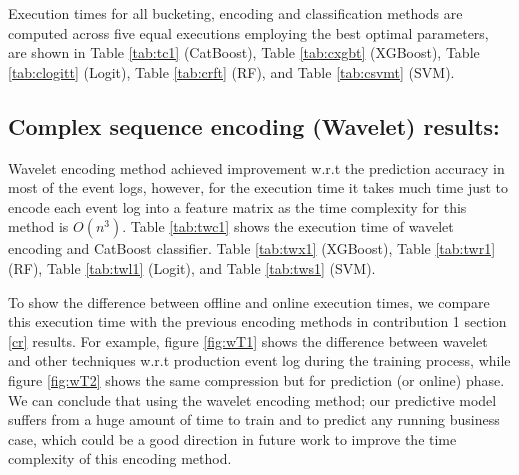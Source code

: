 Execution times for all bucketing, encoding and classification methods are computed across five equal executions employing the best optimal parameters, are shown in Table \ref{tab:tc1} (CatBoost), Table  \ref{tab:cxgbt} (XGBoost), Table \ref{tab:clogitt} (Logit), Table \ref{tab:crft} (RF), and Table  \ref{tab:csvmt} (SVM).









\subsection{Complex sequence encoding (Wavelet) results:}
Wavelet encoding method achieved improvement w.r.t the prediction accuracy in most of the event logs, however, for the execution time it takes much time just to encode each event log into a feature matrix as the time complexity for this method is $O(n^3)$. Table \ref{tab:twc1} shows the execution time of wavelet encoding and CatBoost classifier. Table \ref{tab:twx1} (XGBoost), Table \ref{tab:twr1} (RF), Table \ref{tab:twl1} (Logit), and Table \ref{tab:tws1} (SVM).


To show the difference between offline and online execution times, we compare this execution time with the previous encoding methods in contribution 1 section \ref{cr} results.  For example, figure \ref{fig:wT1} shows the difference between wavelet and other techniques w.r.t production event log during the training process, while figure \ref{fig:wT2} shows the same compression but for prediction (or online) phase. We can conclude that using the wavelet encoding method; our predictive model suffers from a huge amount of time to train and to predict any running business case, which could be a good direction in future work to improve the time complexity of this encoding method. 

